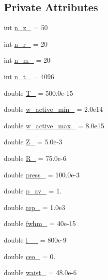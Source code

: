 \subsection*{Private Attributes}
\begin{DoxyCompactItemize}
\item 
int \hyperlink{class_config___settings_a70f51da03f30615877ebfd9c90a2176f}{n\+\_\+z\+\_\+} = 50
\item 
int \hyperlink{class_config___settings_a392b3a78c32ab139f8627f252b03966f}{n\+\_\+r\+\_\+} = 20
\item 
int \hyperlink{class_config___settings_ab4037be8b9ee15482c8e48880ca5d452}{n\+\_\+m\+\_\+} = 20
\item 
int \hyperlink{class_config___settings_a101185a9f55ce89e292d441670518614}{n\+\_\+t\+\_\+} = 4096
\item 
double \hyperlink{class_config___settings_a4f774e23910af488b9006a9c2a0aa1d3}{T\+\_\+} = 500.\+0e-\/15
\item 
double \hyperlink{class_config___settings_a5c77d47f7fc2d699b8cc5589fca7de5e}{w\+\_\+active\+\_\+min\+\_\+} = 2.\+0e14
\item 
double \hyperlink{class_config___settings_a8e1cad65153d6383ed84637ecd794bf0}{w\+\_\+active\+\_\+max\+\_\+} = 8.\+0e15
\item 
double \hyperlink{class_config___settings_a32281faced0dc663ce2b0a4dc6dd25a7}{Z\+\_\+} = 5.\+0e-\/3
\item 
double \hyperlink{class_config___settings_aac0df4d04613e4a96f9f65d26a4a0520}{R\+\_\+} = 75.\+0e-\/6
\item 
double \hyperlink{class_config___settings_afc35b2b38b6e991d38a1a8b7cfae8df4}{press\+\_\+} = 100.\+0e-\/3
\item 
double \hyperlink{class_config___settings_a13ef86da424752b11e8731dfc38ca4d3}{p\+\_\+av\+\_\+} = 1.
\item 
double \hyperlink{class_config___settings_a23a02326925c4c726a5047593435bd72}{rep\+\_\+} = 1.\+0e3
\item 
double \hyperlink{class_config___settings_a40bcd732fb3b33e6424c31a442e04441}{fwhm\+\_\+} = 40e-\/15
\item 
double \hyperlink{class_config___settings_ae98143cb0c84b137e26a4b439e48aada}{l\+\_\+\_\+} = 800e-\/9
\item 
double \hyperlink{class_config___settings_a55a73ac8703ae56cb81bbf601dec24d1}{ceo\+\_\+} = 0.
\item 
double \hyperlink{class_config___settings_a769316096d7aa4e2939ed7fbf7db21e2}{waist\+\_\+} = 48.\+0e-\/6

\end{DoxyCompactItemize}

